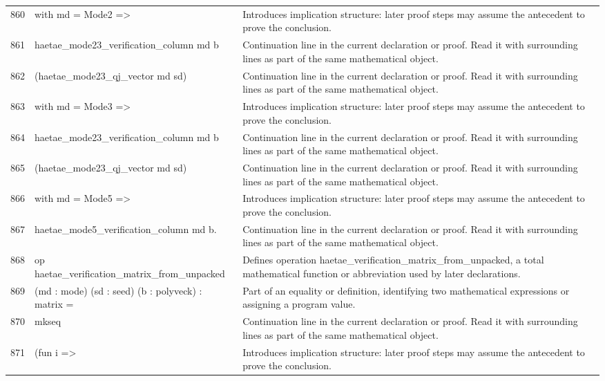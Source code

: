 \documentclass[10pt]{article}
\begin{document}
\begin{longtable}{r L{0.53\textwidth} L{0.37\textwidth}}
860 & {\ttfamily\scriptsize   with md = Mode2 =>} & Introduces implication structure: later proof steps may assume the antecedent to prove the conclusion. \\
861 & {\ttfamily\scriptsize     haetae\_mode23\_verification\_column md b} & Continuation line in the current declaration or proof.  Read it with surrounding lines as part of the same mathematical object. \\
862 & {\ttfamily\scriptsize       (haetae\_mode23\_qj\_vector md sd)} & Continuation line in the current declaration or proof.  Read it with surrounding lines as part of the same mathematical object. \\
863 & {\ttfamily\scriptsize   with md = Mode3 =>} & Introduces implication structure: later proof steps may assume the antecedent to prove the conclusion. \\
864 & {\ttfamily\scriptsize     haetae\_mode23\_verification\_column md b} & Continuation line in the current declaration or proof.  Read it with surrounding lines as part of the same mathematical object. \\
865 & {\ttfamily\scriptsize       (haetae\_mode23\_qj\_vector md sd)} & Continuation line in the current declaration or proof.  Read it with surrounding lines as part of the same mathematical object. \\
866 & {\ttfamily\scriptsize   with md = Mode5 =>} & Introduces implication structure: later proof steps may assume the antecedent to prove the conclusion. \\
867 & {\ttfamily\scriptsize     haetae\_mode5\_verification\_column md b.} & Continuation line in the current declaration or proof.  Read it with surrounding lines as part of the same mathematical object. \\
868 & {\ttfamily\scriptsize op haetae\_verification\_matrix\_from\_unpacked} & Defines operation haetae\_verification\_matrix\_from\_unpacked, a total mathematical function or abbreviation used by later declarations. \\
869 & {\ttfamily\scriptsize    (md : mode) (sd : seed) (b : polyveck) : matrix =} & Part of an equality or definition, identifying two mathematical expressions or assigning a program value. \\
870 & {\ttfamily\scriptsize   mkseq} & Continuation line in the current declaration or proof.  Read it with surrounding lines as part of the same mathematical object. \\
871 & {\ttfamily\scriptsize     (fun i =>} & Introduces implication structure: later proof steps may assume the antecedent to prove the conclusion. \\

\end{longtable}
\end{document}

